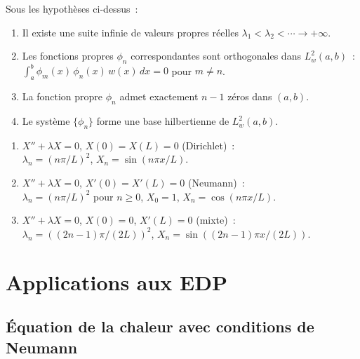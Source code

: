 \begin{theoreme}
Sous les hypoth\`eses ci-dessus~:
\begin{enumerate}
    \item Il existe une suite infinie de valeurs propres r\'eelles
          $\lambda_1 < \lambda_2 < \cdots \to +\infty$.
    \item Les fonctions propres $\phi_n$ correspondantes sont orthogonales
          dans $L^2_w(a,b)$~:
          $\int_a^b \phi_m(x)\, \phi_n(x)\, w(x)\, dx = 0$ pour $m \neq n$.
    \item La fonction propre $\phi_n$ admet exactement $n-1$ z\'eros dans
          $(a,b)$.
    \item Le syst\`eme $\{\phi_n\}$ forme une base hilbertienne de $L^2_w(a,b)$.
\end{enumerate}
\end{theoreme}

\begin{exemple}
\leavevmode
\begin{enumerate}
    \item $X'' + \lambda X = 0$, $X(0) = X(L) = 0$ (Dirichlet)~:\\
          $\lambda_n = (n\pi/L)^2$, $X_n = \sin(n\pi x/L)$.
    \item $X'' + \lambda X = 0$, $X'(0) = X'(L) = 0$ (Neumann)~:\\
          $\lambda_n = (n\pi/L)^2$ pour $n \geq 0$, $X_0 = 1$,
          $X_n = \cos(n\pi x/L)$.
    \item $X'' + \lambda X = 0$, $X(0) = 0$, $X'(L) = 0$ (mixte)~:\\
          $\lambda_n = ((2n-1)\pi/(2L))^2$, $X_n = \sin((2n-1)\pi x/(2L))$.
\end{enumerate}
\end{exemple}

\section{Applications aux EDP}

\subsection{\'Equation de la chaleur avec conditions de Neumann}

